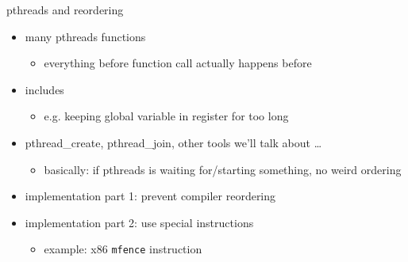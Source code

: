 \begin{frame}{pthreads and reordering}
    \begin{itemize}
    \item many pthreads functions 
        \begin{itemize}
        \item everything before function call actually happens before 
        \end{itemize}
    \item includes 
        \begin{itemize}
        \item e.g. keeping global variable in register for too long
        \end{itemize}
    \vspace{.5cm}
    \item pthread\_create, pthread\_join, other tools we'll talk about \ldots
        \begin{itemize}
        \item basically: if pthreads is waiting for/starting something, no weird ordering
        \end{itemize}
    \item implementation part 1: prevent compiler reordering
    \item implementation part 2: use special instructions
        \begin{itemize}
        \item example: x86 \texttt{mfence} instruction
        \end{itemize}
    \end{itemize}
\end{frame}

